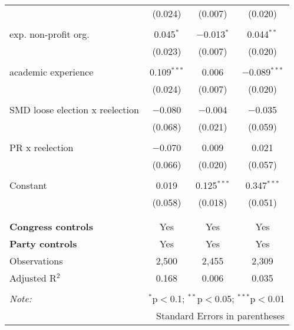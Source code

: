 \documentclass{article}
\begin{document}
\begin{table}[!htbp]
\begin{tabular}{@{\extracolsep{5pt}}lccc}
  & (0.024) & (0.007) & (0.020) \\ 
  & & & \\ 
 exp. non-profit org. & 0.045$^{*}$ & $-$0.013$^{*}$ & 0.044$^{**}$ \\ 
  & (0.023) & (0.007) & (0.020) \\ 
  & & & \\ 
 academic experience & 0.109$^{***}$ & 0.006 & $-$0.089$^{***}$ \\ 
  & (0.024) & (0.007) & (0.020) \\ 
  & & & \\ 
 SMD loose election x reelection & $-$0.080 & $-$0.004 & $-$0.035 \\ 
  & (0.068) & (0.021) & (0.059) \\ 
  & & & \\ 
 PR x reelection & $-$0.070 & 0.009 & 0.021 \\ 
  & (0.066) & (0.020) & (0.057) \\ 
  & & & \\ 
 Constant & 0.019 & 0.125$^{***}$ & 0.347$^{***}$ \\ 
  & (0.058) & (0.018) & (0.051) \\ 
  & & & \\ 
\hline \\[-1.8ex] 
\textbf{Congress controls} & Yes & Yes & Yes \\ 
\textbf{Party controls} & Yes & Yes & Yes \\ 
Observations & 2,500 & 2,455 & 2,309 \\ 
Adjusted R$^{2}$ & 0.168 & 0.006 & 0.035 \\ 
\hline 
\hline \\[-1.8ex] 
\textit{Note:}  & \multicolumn{3}{r}{$^{*}$p$<$0.1; $^{**}$p$<$0.05; $^{***}$p$<$0.01} \\ 
 & \multicolumn{3}{r}{Standard Errors in parentheses} \\ 
\end{tabular} 
\end{table} 
\end{document}
